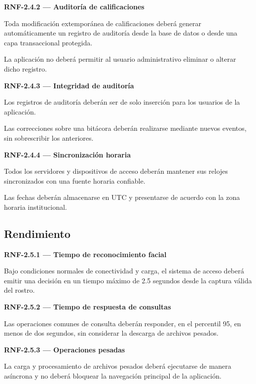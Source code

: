 \documentclass[12pt,a4paper]{article}
\newcommand{\RNF}[1]{\textbf{\color{secondary}RNF-#1}}
\newenvironment{requisito}[1]
{
\begin{center}
\begin{minipage}{0.96\textwidth}
\colorbox{requirement}{
\begin{minipage}{0.94\textwidth}
\textbf{#1}
\end{minipage}
}
\vspace{2mm}
}
{
\end{minipage}
\end{center}
}
\begin{document}
\begin{requisito}{\RNF{2.4.2} --- Auditoría de calificaciones}
Toda modificación extemporánea de calificaciones deberá generar automáticamente
un registro de auditoría desde la base de datos o desde una capa transaccional
protegida.

La aplicación no deberá permitir al usuario administrativo eliminar o alterar
dicho registro.
\end{requisito}

\begin{requisito}{\RNF{2.4.3} --- Integridad de auditoría}
Los registros de auditoría deberán ser de solo inserción para los usuarios de la
aplicación.

Las correcciones sobre una bitácora deberán realizarse mediante nuevos eventos,
sin sobrescribir los anteriores.
\end{requisito}

\begin{requisito}{\RNF{2.4.4} --- Sincronización horaria}
Todos los servidores y dispositivos de acceso deberán mantener sus relojes
sincronizados con una fuente horaria confiable.

Las fechas deberán almacenarse en UTC y presentarse de acuerdo con la zona
horaria institucional.
\end{requisito}

\subsection{Rendimiento}

\begin{requisito}{\RNF{2.5.1} --- Tiempo de reconocimiento facial}
Bajo condiciones normales de conectividad y carga, el sistema de acceso deberá
emitir una decisión en un tiempo máximo de 2.5 segundos desde la captura válida
del rostro.
\end{requisito}

\begin{requisito}{\RNF{2.5.2} --- Tiempo de respuesta de consultas}
Las operaciones comunes de consulta deberán responder, en el percentil 95, en
menos de dos segundos, sin considerar la descarga de archivos pesados.
\end{requisito}

\begin{requisito}{\RNF{2.5.3} --- Operaciones pesadas}
La carga y procesamiento de archivos pesados deberá ejecutarse de manera
asíncrona y no deberá bloquear la navegación principal de la aplicación.
\end{requisito}
\end{document}

